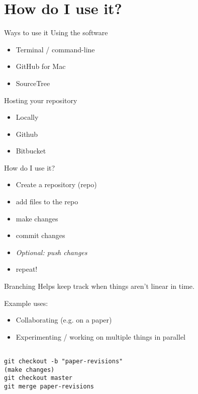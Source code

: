 \documentclass{beamer}
\begin{document}
\section{How do I use it?}

\begin{frame}{Ways to use it}
    Using the software
    \begin{itemize}
        \item Terminal / command-line
        \item GitHub for Mac
        \item SourceTree
    \end{itemize}
    Hosting your repository
    \begin{itemize}
        \item Locally
        \item Github
        \item Bitbucket
    \end{itemize}
\end{frame}

\begin{frame}{How do I use it?}
  \begin{itemize}
  \item Create a repository (repo)
  \item add files to the repo
  \item make changes
  \item commit changes
  \item \textit{Optional: push changes}
  \item repeat!
  \end{itemize}

\end{frame}

\begin{frame}[fragile]
    \begin{block}{Branching}
        Helps keep track when things aren't linear in time.

        Example uses:
        \begin{itemize}
            \item Collaborating (e.g. on a paper)
            \item Experimenting / working on multiple things in parallel
        \end{itemize}

        \begin{verbatim}

git checkout -b "paper-revisions"
(make changes)
git checkout master
git merge paper-revisions

        \end{verbatim}
    \end{block}
\end{frame}
\end{document}
